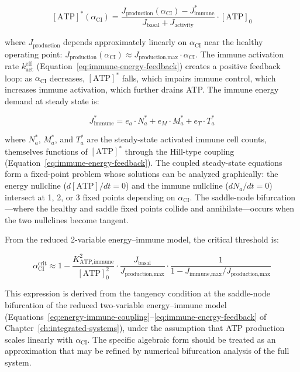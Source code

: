 \begin{equation}
\label{eq:atp-ss-ci}
[\text{ATP}]^*(\alpha_{\text{CI}}) = \frac{J_{\text{production}}(\alpha_{\text{CI}}) - J_{\text{immune}}^*}{J_{\text{basal}} + J_{\text{activity}}} \cdot [\text{ATP}]_0
\end{equation}

where $J_{\text{production}}$ depends approximately linearly on $\alpha_{\text{CI}}$ near the healthy operating point: $J_{\text{production}}(\alpha_{\text{CI}}) \approx J_{\text{production,max}} \cdot \alpha_{\text{CI}}$. The immune activation rate $k_{\text{act}}^{\text{eff}}$ (Equation~\ref{eq:immune-energy-feedback}) creates a positive feedback loop: as $\alpha_{\text{CI}}$ decreases, $[\text{ATP}]^*$ falls, which impairs immune control, which increases immune activation, which further drains ATP. The immune energy demand at steady state is:

\begin{equation}
\label{eq:immune-demand-ss}
J_{\text{immune}}^* = e_a \cdot N_a^* + e_M \cdot M_a^* + e_T \cdot T_a^*
\end{equation}

where $N_a^*$, $M_a^*$, and $T_a^*$ are the steady-state activated immune cell counts, themselves functions of $[\text{ATP}]^*$ through the Hill-type coupling (Equation~\ref{eq:immune-energy-feedback}). The coupled steady-state equations form a fixed-point problem whose solutions can be analyzed graphically: the energy nullcline ($d[\text{ATP}]/dt = 0$) and the immune nullcline ($dN_a/dt = 0$) intersect at 1, 2, or 3 fixed points depending on $\alpha_{\text{CI}}$. The saddle-node bifurcation---where the healthy and saddle fixed points collide and annihilate---occurs when the two nullclines become tangent.

From the reduced 2-variable energy--immune model, the critical threshold is:

\begin{equation}
\label{eq:ci-critical}
\alpha_{\text{CI}}^{\mathrm{crit}} \approx 1 - \frac{K_{\text{ATP,immune}}^2}{[\text{ATP}]_0^2} \cdot \frac{J_{\text{basal}}}{J_{\text{production,max}}} \cdot \frac{1}{1 - J_{\text{immune,max}}/J_{\text{production,max}}}
\end{equation}

This expression is derived from the tangency condition at the saddle-node bifurcation of the reduced two-variable energy--immune model (Equations~\ref{eq:energy-immune-coupling}--\ref{eq:immune-energy-feedback} of Chapter~\ref{ch:integrated-systems}), under the assumption that ATP production scales linearly with $\alpha_{\text{CI}}$. The specific algebraic form should be treated as an approximation that may be refined by numerical bifurcation analysis of the full system.

